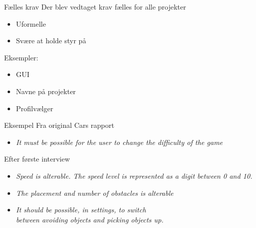 \begin{frame}{Fælles krav}
Der blev vedtaget krav fælles for alle projekter
\begin{itemize}
\item Uformelle 
\item Svære at holde styr på
\end{itemize}

Eksempler:
\begin{itemize}
\item GUI
\item Navne på projekter
\item Profilvælger
\end{itemize}
\end{frame}

\begin{frame}{Eksempel}
Fra original Cars rapport
\begin{itemize}
\item \textit{It must be possible for the user to change the difficulty of the game}
\end{itemize}

Efter første interview
\begin{itemize}
\item \textit{Speed is alterable. The speed level is represented as a digit between 0 and 10.}
\item \textit{The placement and number of obstacles is alterable}
\item\textit{ It should be possible, in settings, to switch\\ between avoiding objects and picking objects up.}
\end{itemize}
\end{frame}
